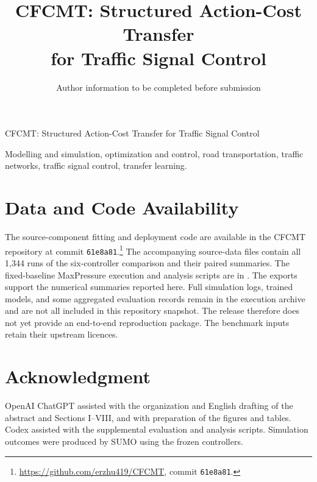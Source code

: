 \documentclass[letterpaper,journal]{IEEEtran}
\begin{document}
\title{CFCMT: Structured Action-Cost Transfer\\for Traffic Signal Control}
\author{Author information to be completed before submission}
%
{CFCMT: Structured Action-Cost Transfer for Traffic Signal Control}
\maketitle

\begin{IEEEkeywords}
Modelling and simulation, optimization and control, road transportation, traffic networks, traffic signal control, transfer learning.
\end{IEEEkeywords}








\section*{Data and Code Availability}
\begingroup\raggedright
The source-component fitting and deployment code are available in the CFCMT repository at commit \texttt{61e8a81}.\footnote{\url{https://github.com/erzhu419/CFCMT}, commit \texttt{61e8a81}.}
The accompanying source-data files contain all 1,344 runs of the six-controller comparison and their paired summaries. The fixed-baseline MaxPressure execution and analysis scripts are in .
The exports support the numerical summaries reported here. Full simulation logs, trained models, and some aggregated evaluation records remain in the execution archive and are not all included in this repository snapshot. The release therefore does not yet provide an end-to-end reproduction package. The benchmark inputs retain their upstream licences.
\par\endgroup
\section*{Acknowledgment}
OpenAI ChatGPT assisted with the organization and English drafting of the abstract and Sections I--VIII, and with preparation of the figures and tables. Codex assisted with the supplemental evaluation and analysis scripts. Simulation outcomes were produced by SUMO using the frozen controllers.



\end{document}
